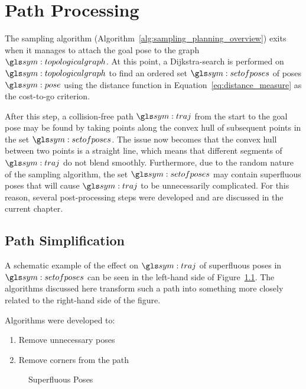 \chapter{Path Processing}%
\label{chap:path_processing}

	The sampling algorithm (Algorithm~\ref{alg:sampling_planning_overview})
	exits when it manages to attach the goal pose to the graph
	$\topologicalgraph$. At this point, a Dijkstra-search is performed on
	$\topologicalgraph$ to find an ordered set $\setofposes$ of poses $\pose$
	using the distance function in Equation~\ref{eq:distance_measure} as the
	cost-to-go criterion.

	After this step, a collision-free path $\pathsym$ from the start to the goal
	pose may be found by taking points along the convex hull of subsequent
	points in the set $\setofposes$. The issue now becomes that the convex hull
	between two points is a straight line, which means that different segments
	of $\pathsym$ do not blend smoothly. Furthermore, due to the random nature
	of the sampling algorithm, the set $\setofposes$ may contain superfluous
	poses that will cause $\pathsym$ to be unnecessarily complicated. For this
	reason, several post-processing steps were developed and are discussed in
	the current chapter.

	\section{Path Simplification}%
	\label{sec:path_simplifcation}

		A schematic example of the effect on $\pathsym$ of superfluous poses in
		$\setofposes$ can be seen in the left-hand side of
		Figure~\ref{fig:superfluous_poses}. The algorithms discussed here
		transform such a path into something more closely related to the
		right-hand side of the figure.

		Algorithms were developed to:

		\begin{enumerate}

			\item

				Remove unnecessary poses

			\item

				Remove corners from the path

		\end{enumerate}

		\begin{figure}[hb]
			\caption{Superfluous Poses}%
			\label{fig:superfluous_poses}
			\missingfigure{}
		\end{figure}

